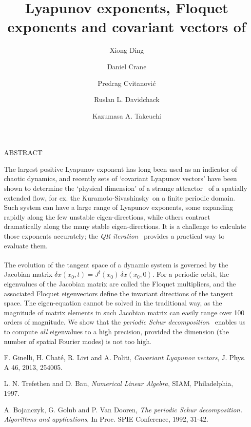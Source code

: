 \documentclass[12pt]{article}
\title{Lyapunov exponents, Floquet exponents and covariant vectors of \KSe}
\date{}
\author[1]{Xiong Ding}
\author[2]{Daniel Crane}
\author[1]{Predrag Cvitanovi\'{c}}
\author[2]{Ruslan L. Davidchack}
\author[3]{Kazumasa A. Takeuchi}
\affil[1]{School of Physics, Georgia Inst. of Technology,\emailaddress{xding@gatech.edu}}
\affil[2]{Dept. of Mathematics, Univ. of Leicester,
          Leicester LE1 7RH, UK}
\affil[3]{Dept. of Physics, Univ. of Tokyo, Japan}
\newcommand{\KS}{Kuramoto-Siva\-shin\-sky}
\newcommand{\smalllineskip}{\baselineskip=5pt}
\renewenvironment{abstract}[0]{\small\rm
        \begin{center}ABSTRACT
        \\ \vspace{2pt}
        \begin{minipage}{6.0in}\smalllineskip
        \hspace{1pc}}{\end{minipage}\end{center}\vspace{-1pt}}
\begin{document}
\maketitle

\begin{abstract}
The largest positive Lyapunov exponent has long been used as an
indicator of chaotic dynamics, and recently sets of `covariant Lyapunov vectors'
have been shown to determine the `physical dimension' of a strange
attractor~\cite{GiChLiPo12} of a spatially extended flow,
for ex. the \KS\ on a finite periodic
domain. Such system can have a large range of Lyapunov
exponents, some
 expanding rapidly along the few unstable eigen-directions,
 while others contract dramatically along the many stable eigen-directions.
It
is a challenge to calculate those exponents accurately; the
\textit{QR iteration}~\cite{Trefethen97} provides a practical way to
evaluate them.
\\\\

The evolution of the tangent space of a dynamic system is governed by
the Jacobian matrix $\delta x(x_0, t)=J^t(x_0)\,\delta x(x_0, 0)$.
For a periodic orbit, the eigenvalues of the Jacobian matrix are called the
Floquet multipliers, and the associated Floquet eigenvectors
define the invariant directions
of the tangent space. The eigen-equation cannot be solved in
the traditional way, as the magnitude of matrix elements in such
Jacobian matrix can easily range over 100 orders of magnitude.
We show that the \textit{periodic Schur
decomposition}~\cite{Bojanczyk92theperiodic} enables us to compute
{\em all} eigenvalues to a high precision, provided the dimension
(the number of spatial Fourier modes) is not too high.



\end{abstract}

\begin{thebibliography}{99}
\small
{}
    F. Ginelli, H. Chat\'{e}, R. Livi and A. Politi,
  \textit{Covariant {Lyapunov} vectors}, J. Phys. A 46,
 2013, 254005.

 L. N. Trefethen and D. Bau, \textit{Numerical Linear
    Algebra}, SIAM, Philadelphia, 1997.

 A. Bojanczyk, G. Golub and P. Van Dooren,
    \textit{The periodic Schur decomposition. Algorithms and
    applications}, In Proc. SPIE Conference, 1992, 31-42.

\end{thebibliography}
\end{document}
